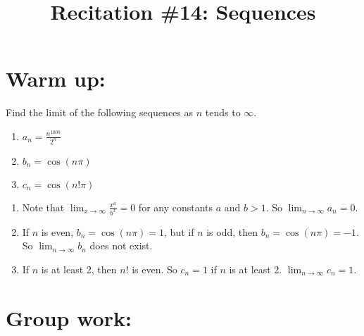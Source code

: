 \documentclass[noinstructornotes]{ximera}
\title{Recitation \#14: Sequences}
\begin{document}
\begin{abstract}		\end{abstract}
\maketitle



\section{Warm up:}
Find the limit of the following sequences as $n$ tends to $\infty$. 
\begin{enumerate}

\item $a_n = \frac{n^{1000}}{2^n}$

	
\item $b_n = \cos (n \pi)$

\item $c_n = \cos (n! \pi)$

\end{enumerate}
	\begin{freeResponse}
\begin{enumerate}	
\item Note that $\lim_{x \to \infty} \frac{x^a}{b^x} = 0$ for any constants $a$ and $b>1$. So $\lim_{n \to \infty} a_n =0$.
\item If $n$ is even, $b_n = \cos(n \pi) = 1$, but if $n$ is odd, then $b_n = \cos(n \pi) = -1$. So $\lim_{n \to \infty} b_n$ does not exist.
\item If $n$ is at least 2, then $n!$ is even. So $c_n = 1$ if $n$ is at least 2. $\lim_{n \to \infty} c_n = 1$. 
\end{enumerate}
	\end{freeResponse}
\begin{instructorNotes}

\end{instructorNotes}







\section{Group work:}
\end{document}
